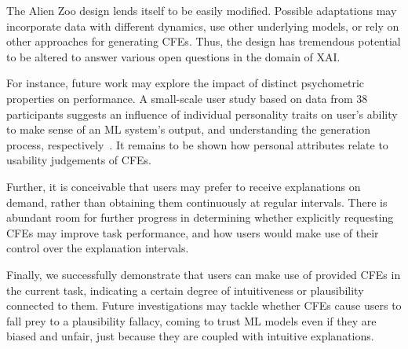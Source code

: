 {%
The Alien Zoo design lends itself to be easily modified. 
Possible adaptations may incorporate data with different dynamics, use other underlying models, or rely on other approaches for generating \glspl{CFE}.
Thus, the design has tremendous potential to be altered to answer various open questions in the domain of \gls{XAI}.

For instance, future work may explore the impact of distinct psychometric properties on performance. 
A small-scale user study based on data from 38 participants suggests an influence of individual personality traits on user's ability to make sense of an \gls{ML} system's output, and understanding the generation process, respectively~\citep{gleaves_role_2020}.
It remains to be shown how personal attributes relate to usability judgements of \glspl{CFE}.

Further, it is conceivable that users may prefer to receive explanations on demand, rather than obtaining them continuously at regular intervals.
There is abundant room for further progress in determining whether explicitly requesting \glspl{CFE} may improve task performance, and how users would make use of their control over the explanation intervals.

Finally, we successfully demonstrate that users can make use of provided \glspl{CFE} in the current task, indicating a certain degree of intuitiveness or plausibility connected to them. 
Future investigations may tackle whether \glspl{CFE} cause users to fall prey to a plausibility fallacy, coming to trust ML models even if they are biased and unfair, just because they are coupled with intuitive explanations.

}
